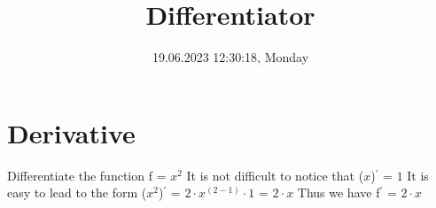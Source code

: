 \documentclass{article}
\title{Differentiator}
\date{19.06.2023 12:30:18, Monday}
\begin{document}
\maketitle

\section {Derivative}
Differentiate the function f = $ {x}^{2} $\newline
It is not difficult to notice that \newline
($ x $)$ ^\prime $ = $ 1 $\newline
\newline
It is easy to lead to the form \newline
($ {x}^{2} $)$ ^\prime $ = $ 2 \cdot {x}^{(2 - 1)} \cdot 1 $ = $ 2 \cdot x $\newline
\newline
Thus we have f$^\prime$ = $ 2 \cdot x $
\end{document}
